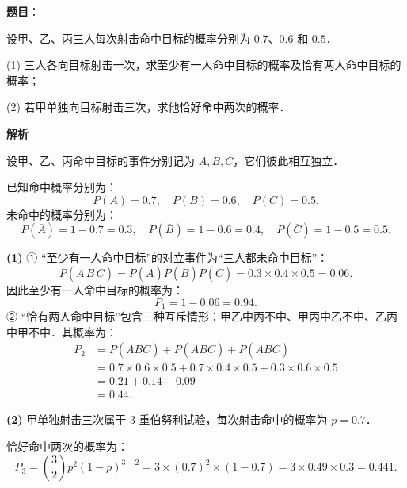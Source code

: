\begin{answer}

\textbf{题目}：

设甲、乙、丙三人每次射击命中目标的概率分别为 $0.7$、$0.6$ 和 $0.5$．

(1) 三人各向目标射击一次，求至少有一人命中目标的概率及恰有两人命中目标的概率；

(2) 若甲单独向目标射击三次，求他恰好命中两次的概率．

\textbf{解析}

设甲、乙、丙命中目标的事件分别记为 $A, B, C$，它们彼此相互独立．

已知命中概率分别为：
\nopagebreak[4]
\[
P(A) = 0.7, \quad P(B) = 0.6, \quad P(C) = 0.5.
\]
未命中的概率分别为：
\nopagebreak[4]
\[
P(\overline{A}) = 1 - 0.7 = 0.3, \quad P(\overline{B}) = 1 - 0.6 = 0.4, \quad P(\overline{C}) = 1 - 0.5 = 0.5.
\]

\textbf{(1)}
① “至少有一人命中目标”的对立事件为“三人都未命中目标”：
\nopagebreak[4]
\[
P(\overline{A}\,\overline{B}\,\overline{C}) = P(\overline{A}) P(\overline{B}) P(\overline{C}) = 0.3 \times 0.4 \times 0.5 = 0.06.
\]
因此至少有一人命中目标的概率为：
\nopagebreak[4]
\[
P_1 = 1 - 0.06 = 0.94.
\]
② “恰有两人命中目标”包含三种互斥情形：甲乙中丙不中、甲丙中乙不中、乙丙中甲不中．其概率为：
\nopagebreak[4]
\[
\begin{aligned}
P_2 &= P(AB\overline{C}) + P(A\overline{B}C) + P(\overline{A}BC) \\
&= 0.7 \times 0.6 \times 0.5 + 0.7 \times 0.4 \times 0.5 + 0.3 \times 0.6 \times 0.5 \\
&= 0.21 + 0.14 + 0.09 \\
&= 0.44.
\end{aligned}
\]

\textbf{(2)}
甲单独射击三次属于 $3$ 重伯努利试验，每次射击命中的概率为 $p = 0.7$．

恰好命中两次的概率为：
\nopagebreak[4]
\[
P_3 = \binom{3}{2} p^2 (1 - p)^{3 - 2} = 3 \times (0.7)^2 \times (1 - 0.7) = 3 \times 0.49 \times 0.3 = 0.441.
\]



\end{answer}
